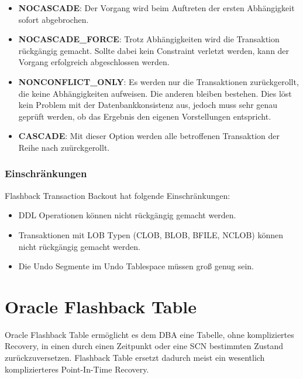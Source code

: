           \begin{itemize}
            \item \textbf{NOCASCADE}: Der Vorgang wird beim Auftreten der ersten Abh\"angigkeit sofort abgebrochen.
            \item \textbf{NOCASCADE\_FORCE}: Trotz Abh\"angigkeiten wird die Transaktion r\"uckg\"angig gemacht. Sollte dabei kein Constraint verletzt werden, kann der Vorgang erfolgreich abgeschlossen werden.
            \item \textbf{NONCONFLICT\_ONLY}: Es werden nur die Transaktionen zur\"uckgerollt, die keine Abh\"angigkeiten aufweisen. Die anderen bleiben bestehen. Dies l\"ost kein Problem mit der Datenbankkonsistenz aus, jedoch muss sehr genau gepr\"uft werden, ob das Ergebnis den eigenen Vorstellungen entspricht.
            \item \textbf{CASCADE}: Mit dieser Option werden alle betroffenen Transaktion der Reihe nach zu\"urckgerollt.
          \end{itemize}
        \subsubsection{Einschr\"ankungen}
          Flashback Transaction Backout hat folgende Einschr\"ankungen:
          \begin{itemize}
            \item DDL Operationen k\"onnen nicht r\"uckg\"angig gemacht werden.
            \item Transaktionen mit LOB Typen (CLOB, BLOB, BFILE, NCLOB) k\"onnen nicht r\"uckg\"angig gemacht werden.
            \item Die Undo Segmente im Undo Tablespace m\"ussen gro\ss{} genug sein.
          \end{itemize}

          \begin{literaturinternet}
            \item \cite{dflashbhtm}
            \item \cite{ADFNS01009}
          \end{literaturinternet}
    \section{Oracle Flashback Table}
      Oracle Flashback Table erm\"oglicht es dem DBA eine Tabelle, ohne kompliziertes Recovery, in einen durch einen Zeitpunkt oder eine SCN bestimmten Zustand zur\"uckzuversetzen. Flashback Table ersetzt dadurch meist ein wesentlich komplizierteres Point-In-Time Recovery.

